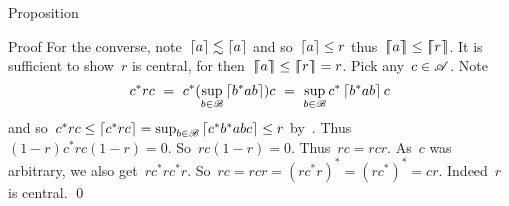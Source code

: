 \documentclass[b]{subfiles}
\begin{document}
\begin{parsec}
\begin{point}{Proposition}
\begin{point}{Proof}
For the converse, note~$\left\lceil a\right\rceil \lesssim \left\lceil a\right\rceil$
    and so~$\left\lceil a\right\rceil \leq r$
    thus~$\cceil{a} \leq \cceil{r}$.
It is sufficient to show~$r$ is central, for
        then~$\cceil{a} \leq \cceil{r} = r$.
Pick any~$c \in \mathscr{A}$.
Note
\begin{equation*}
    c^*rc
    \ =\ c^* (\sup_{b \in \mathscr{B}} \left\lceil b^*ab\right\rceil) c
    \ =\ \sup_{b \in \mathscr{B}} c^* \left\lceil b^*ab\right\rceil c
\end{equation*}
and so~$c^*rc \leq \left\lceil c^* r c\right\rceil = \sup_{b \in \mathscr{B}} \left\lceil c^*b^*abc\right\rceil \leq r$
    by~.
Thus~$(1-r)c^*rc(1-r) = 0$.
So~$rc(1-r)=0$.
Thus~$rc = rcr$.
As~$c$ was arbitrary, we also get~$rc^* rc^*r$.
So~$rc = rcr = (rc^*r)^* = (rc^*)^* = cr$.
Indeed~$r$ is central. \qed
\end{point}
\end{point}
\end{parsec}
\end{document}
